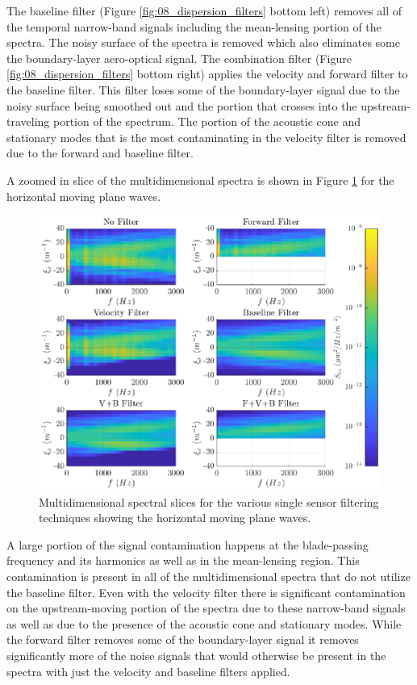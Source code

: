 The baseline filter (Figure \ref{fig:08_dispersion_filters} bottom left) removes all of the temporal narrow-band signals including the mean-lensing portion of the spectra.
The noisy surface of the spectra is removed which also eliminates some the boundary-layer aero-optical signal.
The combination filter (Figure \ref{fig:08_dispersion_filters} bottom right) applies the velocity and forward filter to the baseline filter.
This filter loses some of the boundary-layer signal due to the noisy surface being smoothed out and the portion that crosses into the upstream-traveling portion of the spectrum.
The portion of the acoustic cone and stationary modes that is the most contaminating in the velocity filter is removed due to the forward and baseline filter.

A zoomed in slice of the multidimensional spectra is shown in Figure \ref{fig:08_dispersion_filters_slices} for the horizontal moving plane waves.
\begin{figure}
  \centering
  \includegraphics{../matlab/08_conclusion/dispersion_filters_slices.eps}
  \caption{Multidimensional spectral slices for the various single sensor filtering techniques showing the horizontal moving plane waves.}
  \label{fig:08_dispersion_filters_slices}
\end{figure}
A large portion of the signal contamination happens at the blade-passing frequency and its harmonics as well as in the mean-lensing region.
This contamination is present in all of the multidimensional spectra that do not utilize the baseline filter.
Even with the velocity filter there is significant contamination on the upstream-moving portion of the spectra due to these narrow-band signals as well as due to the presence of the acoustic cone and stationary modes.
While the forward filter removes some of the boundary-layer signal it removes significantly more of the noise signals that would otherwise be present in the spectra with just the velocity and baseline filters applied.


